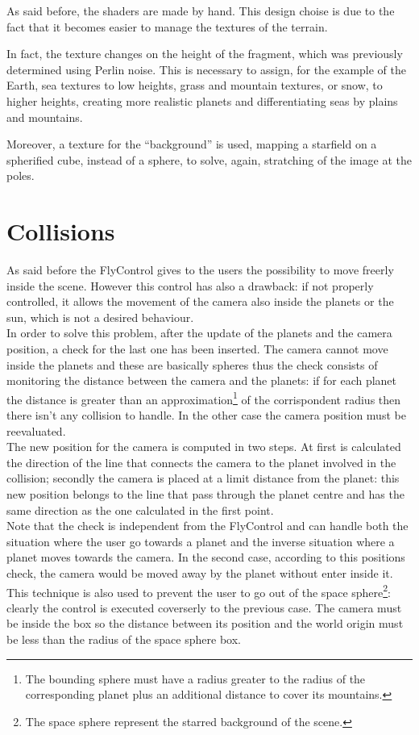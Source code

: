 \documentclass[paper=a4, fontsize=11pt]{scrartcl} %
\numberwithin{equation}{section} %
\numberwithin{figure}{section} %
\numberwithin{table}{section} %
\theoremstyle{definition}
\begin{document}
As said before, the shaders are made by hand. This design choise is due to
the fact that it becomes easier to manage the textures of the terrain.

In fact, the texture changes on the height of the fragment, which was previously
determined using Perlin noise. This is necessary to assign, for the example
of the Earth, sea textures to low
heights, grass and mountain textures, or snow, to higher heights, creating
more realistic planets and differentiating seas by plains and mountains.

Moreover, a texture for the ``background'' is used, mapping a starfield on a
spherified cube, instead of a sphere, to solve, again, stratching of the image at the poles.


\section{Collisions}

As said before the FlyControl gives to the users the possibility to move freerly inside the scene. However this control has also a drawback: if not properly controlled, it allows the movement of the camera also inside the planets or the sun, which is not a desired behaviour.\\
In order to solve this problem, after the update of the planets and the camera position, a check for the last one has been inserted. The camera cannot move inside the planets and these are basically spheres thus the check consists of monitoring the distance between the camera and the planets: if for each planet the distance is greater than an approximation\footnote{The bounding sphere must have a radius greater to the radius of the corresponding planet plus an additional distance to cover its mountains.} of the corrispondent radius then there isn't any collision to handle. In the other case the camera position must be reevaluated.\\
The new position for the camera is computed in two steps. At first is calculated the direction of the line that connects the camera to the planet involved in the collision; secondly the camera is placed at a limit distance from the planet: this new position belongs to the line that pass through the planet centre and has the same direction as the one calculated in the first point.\\
Note that the check is independent from the FlyControl and can handle both the situation where the user go towards a planet and the inverse situation where a planet moves towards the camera. In the second case, according to this positions check, the camera would be moved away by the planet without enter inside it.\\
This technique is also used to prevent the user to go out of the space sphere\footnote{The space sphere represent the starred background of the scene.}: clearly the control is executed coverserly to the previous case. The camera must be inside the box so the distance between its position and the world origin must be less than the radius of the space sphere box.
\end{document}
